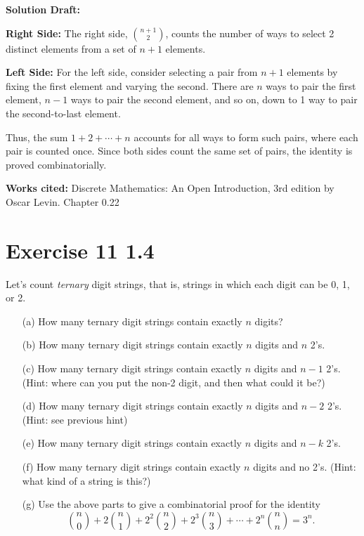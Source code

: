 \documentclass{article}
\begin{document}
\vspace{0.5cm}
\noindent\textbf{Solution Draft:} 
\vspace{0.2cm}

\textbf{Right Side:} The right side, \( \binom{n+1}{2} \), counts the number of ways to select 2 distinct elements from a set of \( n+1 \) elements.

\textbf{Left Side:} For the left side, consider selecting a pair from \( n+1 \) elements by fixing the first element and varying the second. There are \( n \) ways to pair the first element, \( n-1 \) ways to pair the second element, and so on, down to 1 way to pair the second-to-last element.


Thus, the sum \( 1 + 2 + \cdots + n \) accounts for all ways to form such pairs, where each pair is counted once. Since both sides count the same set of pairs, the identity is proved combinatorially.

\vspace{0.5cm}
\textbf{Works cited:}
Discrete Mathematics: An Open Introduction, 3rd edition by Oscar Levin. Chapter 0.22
\section*{Exercise 11 1.4}  

Let's count \textit{ternary} digit strings, that is, strings in which each digit can be 0, 1, or 2.

\begin{enumerate}
    \item[(a)] How many ternary digit strings contain exactly \( n \) digits?
    \item[(b)] How many ternary digit strings contain exactly \( n \) digits and \( n \) 2's.
    \item[(c)] How many ternary digit strings contain exactly \( n \) digits and \( n - 1 \) 2's. (Hint: where can you put the non-2 digit, and then what could it be?)
    \item[(d)] How many ternary digit strings contain exactly \( n \) digits and \( n - 2 \) 2's. (Hint: see previous hint)
    \item[(e)] How many ternary digit strings contain exactly \( n \) digits and \( n - k \) 2's.
    \item[(f)] How many ternary digit strings contain exactly \( n \) digits and no 2's. (Hint: what kind of a string is this?)
    \item[(g)] Use the above parts to give a combinatorial proof for the identity
    \[
    \binom{n}{0} + 2\binom{n}{1} + 2^2\binom{n}{2} + 2^3\binom{n}{3} + \cdots + 2^n\binom{n}{n} = 3^n.
    \]
\end{enumerate}
\end{document}
